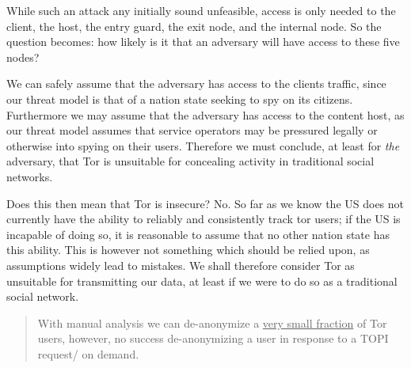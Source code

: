 While such an attack any initially sound unfeasible, access is only needed to
the client, the host, the entry guard, the exit node, and the internal node.
So the question becomes: how likely is it that an adversary will have access to
these five nodes?

We can safely assume that the adversary has access to the clients traffic, since
our threat model is that of a nation state seeking to spy on its citizens.
Furthermore we may assume that the adversary has access to the content host, as
our threat model assumes that service operators may be pressured legally or
otherwise into spying on their users. Therefore we must conclude, at least for
\textit{the} adversary, that Tor is unsuitable for concealing activity in
traditional social networks.

Does this then mean that Tor is insecure? No. So far as we know\cite{torStinks}
the US does not currently have the ability to reliably and consistently track
tor users; if the US is incapable of doing so, it is reasonable to assume that
no other nation state has this ability. This is however not something which
should be relied upon, as assumptions widely lead to mistakes. We shall 
therefore consider Tor as unsuitable for transmitting our data, at least if we 
were to do so as a traditional social network.

\begin{quote}
With manual analysis we can de-anonymize a \uline{very small fraction} of Tor
users, however, no success de-anonymizing a user in response to a TOPI request/
on demand\cite{torStinks}.
\end{quote}
